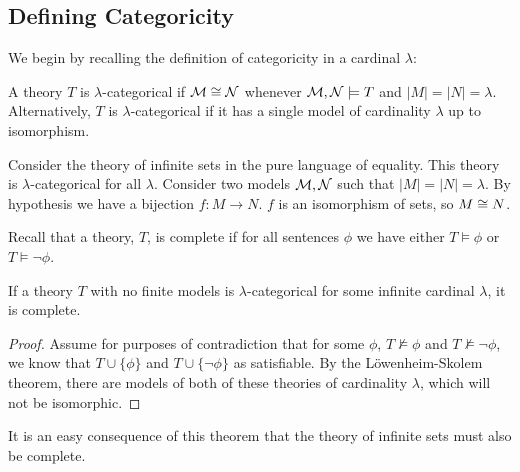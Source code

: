 \subsection{Defining Categoricity}

We begin by recalling the definition of categoricity in a cardinal \(\lambda\):

\begin{definition}\label{def_categoricity}
A theory \(T\) is \(\lambda\)-categorical if \(\mathcal{M} \cong \mathcal{N}\) whenever \(\mathcal{M}, \mathcal{N} \models T\) and \(|M| = |N| = \lambda\).
Alternatively, \(T\) is \(\lambda\)-categorical if it has a single model of cardinality \(\lambda\) up to isomorphism. 
\end{definition}

\begin{example}\label{example_categoricity_sets}
Consider the theory of infinite sets in the pure language of equality. 
This theory is \(\lambda\)-categorical for all \(\lambda\).
Consider two models \(\mathcal{M}, \mathcal{N}\) such that \(|M|=|N|=\lambda\). 
By hypothesis we have a bijection \(f: M \to N\). 
\(f\) is an isomorphism of sets, so \(M \cong N\).
\end{example}

\begin{definition}
Recall that a theory, \(T\), is complete if for all sentences \(\phi\) we have either \(T \models \phi\) or \(T \models \neg \phi\). 
\end{definition}

\begin{theorem}\label{vaughts_test}
If a theory \(T\) with no finite models is \(\lambda\)-categorical for some infinite cardinal \(\lambda\), it is complete.
\end{theorem}

\begin{proof}
Assume for purposes of contradiction that for some \(\phi\), \(T \not \models \phi\) and \(T \not \models \neg \phi\), we know that \(T \cup \{\phi\}\) and \(T \cup \{\neg \phi\}\) as satisfiable. 
By the L\"owenheim-Skolem theorem, there are models of both of these theories of cardinality \(\lambda\), which will not be isomorphic. 
\end{proof}

It is an easy consequence of this theorem that the theory of infinite sets must also be complete. 

